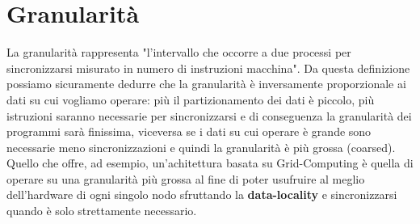 \section{Granularità}
La granularità rappresenta "l'intervallo che occorre a due processi per sincronizzarsi misurato in numero di instruzioni macchina"\cite{cattaneo88}. Da questa definizione possiamo sicuramente dedurre che la granularità è inversamente proporzionale ai dati su cui vogliamo operare: più il partizionamento dei dati è piccolo, più istruzioni saranno necessarie per sincronizzarsi e di conseguenza la granularità dei programmi sarà finissima, viceversa se i dati su cui operare è grande sono necessarie meno sincronizzazioni e quindi la granularità è più grossa (coarsed). Quello che offre, ad esempio, un'achitettura basata su Grid-Computing è quella di operare su una granularità più grossa al fine di poter usufruire al meglio dell'hardware di ogni singolo nodo sfruttando la \textbf{data-locality} e sincronizzarsi quando è solo strettamente necessario.

